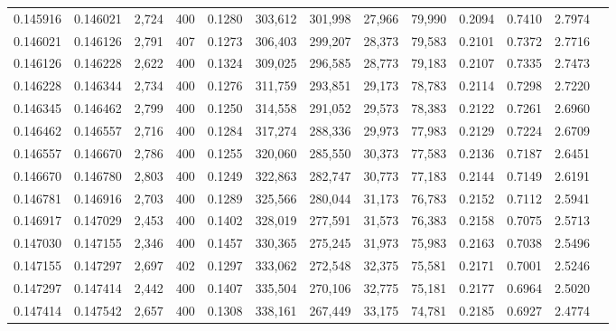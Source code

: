\begin{tabular}{rrrrrrrrrrrrr}
0.145916 & 0.146021 & 2,724 & 400 &                                     0.1280 & 303,612 & 301,998 &  27,966 &  79,990 & 0.2094 & 0.7410 & 2.7974 \\
0.146021 & 0.146126 & 2,791 & 407 &                                     0.1273 & 306,403 & 299,207 &  28,373 &  79,583 & 0.2101 & 0.7372 & 2.7716 \\
0.146126 & 0.146228 & 2,622 & 400 &                                     0.1324 & 309,025 & 296,585 &  28,773 &  79,183 & 0.2107 & 0.7335 & 2.7473 \\
0.146228 & 0.146344 & 2,734 & 400 &                                     0.1276 & 311,759 & 293,851 &  29,173 &  78,783 & 0.2114 & 0.7298 & 2.7220 \\
0.146345 & 0.146462 & 2,799 & 400 &                                     0.1250 & 314,558 & 291,052 &  29,573 &  78,383 & 0.2122 & 0.7261 & 2.6960 \\
0.146462 & 0.146557 & 2,716 & 400 &                                     0.1284 & 317,274 & 288,336 &  29,973 &  77,983 & 0.2129 & 0.7224 & 2.6709 \\
0.146557 & 0.146670 & 2,786 & 400 &                                     0.1255 & 320,060 & 285,550 &  30,373 &  77,583 & 0.2136 & 0.7187 & 2.6451 \\
0.146670 & 0.146780 & 2,803 & 400 &                                     0.1249 & 322,863 & 282,747 &  30,773 &  77,183 & 0.2144 & 0.7149 & 2.6191 \\
0.146781 & 0.146916 & 2,703 & 400 &                                     0.1289 & 325,566 & 280,044 &  31,173 &  76,783 & 0.2152 & 0.7112 & 2.5941 \\
0.146917 & 0.147029 & 2,453 & 400 &                                     0.1402 & 328,019 & 277,591 &  31,573 &  76,383 & 0.2158 & 0.7075 & 2.5713 \\
0.147030 & 0.147155 & 2,346 & 400 &                                     0.1457 & 330,365 & 275,245 &  31,973 &  75,983 & 0.2163 & 0.7038 & 2.5496 \\
0.147155 & 0.147297 & 2,697 & 402 &                                     0.1297 & 333,062 & 272,548 &  32,375 &  75,581 & 0.2171 & 0.7001 & 2.5246 \\
0.147297 & 0.147414 & 2,442 & 400 &                                     0.1407 & 335,504 & 270,106 &  32,775 &  75,181 & 0.2177 & 0.6964 & 2.5020 \\
0.147414 & 0.147542 & 2,657 & 400 &                                     0.1308 & 338,161 & 267,449 &  33,175 &  74,781 & 0.2185 & 0.6927 & 2.4774 \\

\end{tabular}
